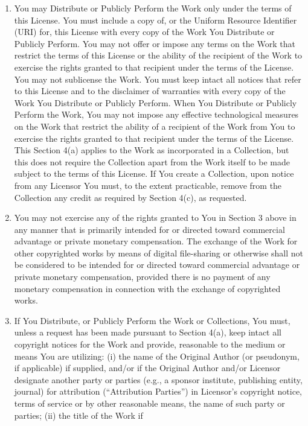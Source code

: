 \begin{enumerate}
\item You may Distribute or Publicly Perform the Work only
under the terms of this License. You must include a copy
of, or the Uniform Resource Identifier (URI) for, this
License with every copy of the Work You Distribute or
Publicly Perform. You may not offer or impose any terms
on the Work that restrict the terms of this License or
the ability of the recipient of the Work to exercise the
rights granted to that recipient under the terms of the
License. You may not sublicense the Work. You must keep
intact all notices that refer to this License and to the
disclaimer of warranties with every copy of the Work You
Distribute or Publicly Perform. When You Distribute or
Publicly Perform the Work, You may not impose any
effective technological measures on the Work that
restrict the ability of a recipient of the Work from You
to exercise the rights granted to that recipient under
the terms of the License. This Section 4(a) applies to
the Work as incorporated in a Collection, but this does
not require the Collection apart from the Work itself to
be made subject to the terms of this License. If You
create a Collection, upon notice from any Licensor You
must, to the extent practicable, remove from the
Collection any credit as required by Section 4(c), as
requested.
\item You may not exercise any of the rights granted to You
in Section 3 above in any manner that is primarily
intended for or directed toward commercial advantage or
private monetary compensation. The exchange of the Work
for other copyrighted works by means of digital
file-sharing or otherwise shall not be considered to be
intended for or directed toward commercial advantage or
private monetary compensation, provided there is no
payment of any monetary compensation in connection with
the exchange of copyrighted works.
\item If You Distribute, or Publicly Perform the Work or
Collections, You must, unless a request has been made
pursuant to Section 4(a), keep intact all copyright
notices for the Work and provide, reasonable to the
medium or means You are utilizing: (i) the name of the
Original Author (or pseudonym, if applicable) if
supplied, and/or if the Original Author and/or Licensor
designate another party or parties (e.g., a sponsor
institute, publishing entity, journal) for attribution
(``Attribution Parties'') in Licensor's copyright notice,
terms of service or by other reasonable means, the name
of such party or parties; (ii) the title of the Work if

\end{enumerate}
